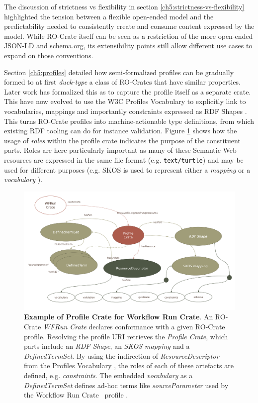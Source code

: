 The discussion of strictness vs flexibility in section \vref{ch5:strictness-vs-flexibility} highlighted the tension between a flexible open-ended model and the predictability needed to consistently create and consume content expressed by the model.
While RO-Crate itself can be seen as a restriction of the more open-ended JSON-LD and schema.org, its extensibility points still allow different use cases to expand on those conventions.  

Section \vref{ch5:profiles} detailed how semi-formalized profiles can be gradually formed to at first \emph{duck-type} a class of RO-Crates that have similar properties.
Later work has formalized this as  to capture the profile itself as a separate crate. This have now evolved to use the W3C Profiles Vocabulary \cite{dx-prof} to explicitly link to vocabularies, mappings and importantly constraints expressed as RDF Shapes \cite{fdo-collections}. 
This turns RO-Crate profiles into machine-actionable type definitions, from which existing RDF tooling can do for instance validation. 
Figure \ref{ch61:fig:profilecrate} shows how the usage of \emph{roles} within the profile crate indicates the purpose of the constituent parts.
Roles are here particularly important as many of these Semantic Web resources are expressed in the same file format (e.g. \texttt{text/turtle}) and may be used for different purposes (e.g.
SKOS is used to represent either a \emph{mapping} or a \emph{vocabulary} \cite{w3-skos-primer}).

\begin{figure}[htb]
    \includegraphics[width=\textwidth]{figures/ch09/profile-crate.pdf}
      \caption[Example of Profile Crate]{\textbf{Example of Profile Crate for Workflow Run Crate}. 
      An RO-Crate \emph{WFRun Crate} declares conformance with a given RO-Crate profile. 
      Resolving the profile URI retrieves the \emph{Profile Crate}, which parts include an \emph{RDF Shape}, an \emph{SKOS mapping} and a \emph{DefinedTermSet}. 
      By using the indirection of \emph{ResourceDescriptor} from the Profiles Vocabulary \cite{dx-prof}, the roles of each of these artefacts are defined, e.g. \emph{constraints}. 
      The embedded \emph{vocabulary} as a \emph{DefinedTermSet} defines ad-hoc terms like \emph{sourceParameter} used by the Workflow Run Crate\footnotemark~ profile \cite{workflow-run-crate}.
      }
    \label{ch61:fig:profilecrate}
  \end{figure}

